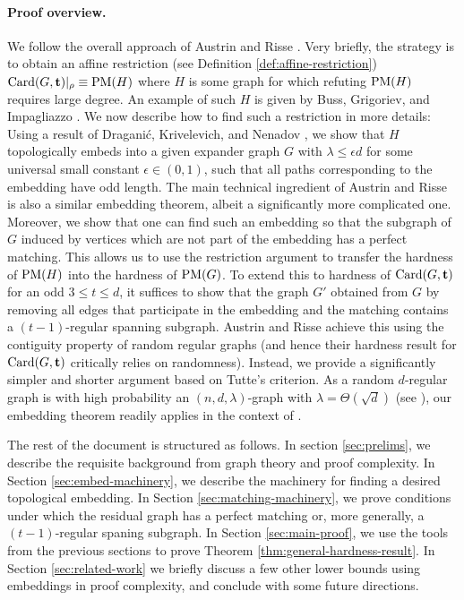 \documentclass[11pt]{article}
\begin{document}
\paragraph{Proof overview.}
We follow the overall approach of Austrin and Risse \cite{Austrin_2022}. Very briefly, the strategy is to obtain an affine restriction (see Definition \ref{def:affine-restriction}) $\text{Card}(G, \mathbf{t})|_\rho \equiv \text{PM}(H)$ where $H$ is some graph for which refuting $\text{PM}(H)$ requires large degree.
An example of such $H$ is given by Buss, Grigoriev, and Impagliazzo \cite{buss1999linear}. We now describe how to find such a restriction in more details: Using a result of Dragani\'c, Krivelevich, and Nenadov \cite{draganic22rolling}, we show that $H$ topologically embeds into a given expander graph $G$ with $\lambda \le \epsilon d$ for some universal small constant $\epsilon \in (0,1)$, such that all paths corresponding to the embedding have odd length.
The main technical ingredient of Austrin and Risse is also a similar embedding theorem, albeit a significantly more complicated one.
Moreover, we show that one can find such an embedding so that the subgraph of $G$ induced by vertices which are not part of the embedding has a perfect matching.
This allows us to use the restriction argument to transfer the hardness of $\text{PM}(H)$ into the hardness of $\text{PM}(G)$.
To extend this to hardness of $\text{Card}(G, \mathbf{t})$ for an odd $3 \le t \leq d$, it suffices to show that the graph $G'$ obtained from $G$ by removing all edges that participate in the embedding and the matching contains a $(t-1)$-regular spanning subgraph.
Austrin and Risse achieve this using the contiguity property of random regular graphs (and hence their hardness result for $\text{Card}(G, \mathbf{t})$ critically relies on randomness). 
Instead, we provide a significantly simpler and shorter argument based on Tutte's criterion.
 As a random $d$-regular graph is with high probability an $(n, d, \lambda)$-graph with $\lambda = \Theta(\sqrt{d})$ (see \cite[Theorem A]{tikhomirov2016spectralgapdenserandom}), our embedding theorem readily applies in the context of \citep{Austrin_2022}.\par
The rest of the document is structured as follows. 
In section \ref{sec:prelims}, we describe the requisite background from graph theory and proof complexity.
In Section \ref{sec:embed-machinery}, we describe the machinery for finding a desired topological embedding.
In Section \ref{sec:matching-machinery}, we prove conditions under which the residual graph has a perfect matching or, more generally, a $(t-1)$-regular spaning subgraph.
In Section \ref{sec:main-proof}, we use the tools from the previous sections to prove Theorem \ref{thm:general-hardness-result}. 
In Section \ref{sec:related-work} we briefly discuss a few other lower bounds using embeddings in proof complexity, and conclude with some future directions.
\end{document}
